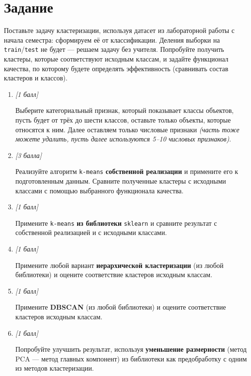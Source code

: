 \section{Задание}

Поставьте задачу кластеризации, используя датасет из лабораторной работы с начала семестра\cite{labin2026pandas}: сформируем её от классификации. Деления выборки на \texttt{train}/\texttt{test} не будет --- решаем задачу без учителя. Попробуйте получить кластеры, которые соответствуют исходным классам, и задайте функционал качества, по которому будете определять эффективность (сравнивать состав кластеров и классов).

\begin{enumerate}[label=\textbf{Task \arabic*:}, leftmargin=*]

\item \textit{[1 балл]}

Выберите категориальный признак, который показывает классы объектов, пусть будет от трёх до шести классов, оставьте только объекты, которые относятся к ним. Далее оставляем только числовые признаки \textit{(часть тоже можете удалить, пусть далее используются 5--10 числовых признаков)}.

\item \textit{[3 балла]}

Реализуйте алгоритм \texttt{k-means} \textbf{собственной реализации} и примените его к подготовленным данным. Сравните полученные кластеры с исходными классами с помощью выбранного функционала качества.

\item \textit{[1 балл]}

Примените \texttt{k-means} \textbf{из библиотеки} \texttt{sklearn} и сравните результат с собственной реализацией и с исходными классами.

\item \textit{[1 балл]}

Примените любой вариант \textbf{иерархической кластеризации} (из любой библиотеки) и оцените соответствие кластеров исходным классам.

\item \textit{[1 балл]}

Примените \textbf{DBSCAN} (из любой библиотеки) и оцените соответствие кластеров исходным классам.

\item \textit{[1 балл]}

Попробуйте улучшить результат, используя \textbf{уменьшение размерности} (метод PCA --- метод главных компонент) из библиотеки как предобработку с одним из методов кластеризации.


\end{enumerate}
